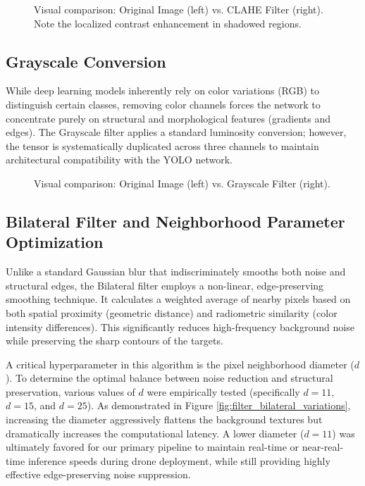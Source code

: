 \begin{figure}[hbt!]
    \centering
    \caption{Visual comparison: Original Image (left) vs. CLAHE Filter (right). Note the localized contrast enhancement in shadowed regions.}
    \label{fig:filter_clahe}
\end{figure}

\subsection{Grayscale Conversion}
While deep learning models inherently rely on color variations (RGB) to distinguish certain classes, removing color channels forces the network to concentrate purely on structural and morphological features (gradients and edges). The Grayscale filter applies a standard luminosity conversion; however, the tensor is systematically duplicated across three channels to maintain architectural compatibility with the YOLO network.

\begin{figure}[hbt!]
    \centering
    \caption{Visual comparison: Original Image (left) vs. Grayscale Filter (right).}
    \label{fig:filter_grayscale}
\end{figure}

\subsection{Bilateral Filter and Neighborhood Parameter Optimization}
Unlike a standard Gaussian blur that indiscriminately smooths both noise and structural edges, the Bilateral filter employs a non-linear, edge-preserving smoothing technique. It calculates a weighted average of nearby pixels based on both spatial proximity (geometric distance) and radiometric similarity (color intensity differences). This significantly reduces high-frequency background noise while preserving the sharp contours of the targets.

A critical hyperparameter in this algorithm is the pixel neighborhood diameter ($d$). To determine the optimal balance between noise reduction and structural preservation, various values of $d$ were empirically tested (specifically $d=11$, $d=15$, and $d=25$). 
As demonstrated in Figure \ref{fig:filter_bilateral_variations}, increasing the diameter aggressively flattens the background textures but dramatically increases the computational latency. A lower diameter ($d=11$) was ultimately favored for our primary pipeline to maintain real-time or near-real-time inference speeds during drone deployment, while still providing highly effective edge-preserving noise suppression.

